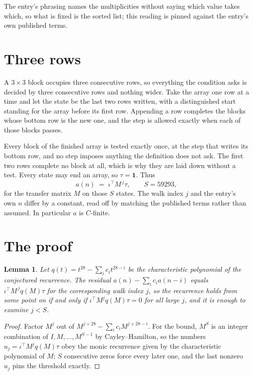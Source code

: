 \documentclass[11pt,a4paper]{article}
\theoremstyle{plain}
\newtheorem{lemma}[theorem]{Lemma}
\theoremstyle{definition}
\begin{document}
The entry's phrasing names the multiplicities without saying which value takes which, so what is fixed is the sorted list; this reading is pinned against the entry's own published terms.

\section{Three rows}

A $3\times3$ block occupies three consecutive rows, so everything the condition asks is decided
by three consecutive rows and nothing wider. Take the array one row at a time and let the state
be the last two rows written, with a distinguished start standing for the array before its
first row. Appending a row completes the blocks whose bottom row is the new one, and the step
is allowed exactly when each of those blocks passes.

Every block of the finished array is tested exactly once, at the step that writes its bottom
row, and no step imposes anything the definition does not ask. The first two rows complete no
block at all, which is why they are laid down without a test. Every state may end an array, so
$\tau=\mathbf{1}$. Thus
\[
a(n)\;=\;\iota^{\!\top}M^{\,j}\tau ,\qquad S=59293,
\]
for the transfer matrix $M$ on those $S$ states. The walk index $j$ and the entry's own $n$
differ by a constant, read off by matching the published terms rather than assumed. In
particular $a$ is $C$-finite.

\section{The proof}

\begin{lemma}\label{lem:crit}
Let $q(t)=t^{28}-\sum_i c_it^{28-i}$ be the characteristic polynomial of the
conjectured recurrence. The residual $a(n)-\sum_ic_ia(n-i)$ equals
$\iota^{\!\top}M^{\,j}q(M)\tau$ for the corresponding walk index $j$, so the recurrence
holds from some point on if and only if $\iota^{\!\top}M^{j}q(M)\tau=0$ for all large $j$,
and it is enough to examine $j<S$.
\end{lemma}

\begin{proof}
Factor $M^{j}$ out of $M^{j+28}-\sum_ic_iM^{j+28-i}$. For the bound, $M^{S}$
is an integer combination of $I,M,\dots,M^{S-1}$ by Cayley--Hamilton, so the numbers
$u_j=\iota^{\!\top}M^{j}q(M)\tau$ obey the monic recurrence given by the characteristic
polynomial of $M$; $S$ consecutive zeros force every later one, and the last nonzero $u_j$
pins the threshold exactly.
\end{proof}
\end{document}

